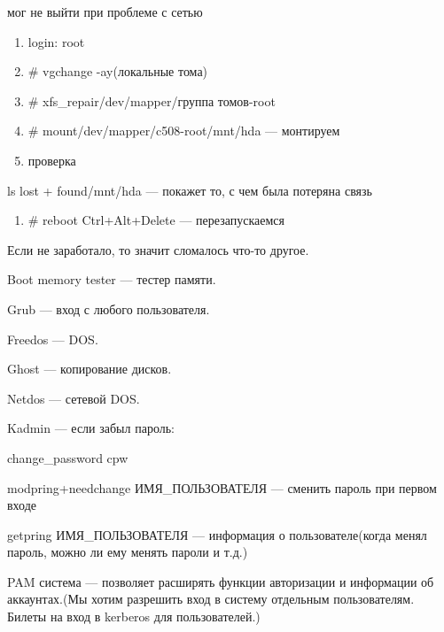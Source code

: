 мог не выйти при проблеме с сетью
\begin{enumerate}
	\item \par 
	login: root 
	
	\item \par 
	\# vgchange -ay(локальные тома)
	\item \par 
	\# xfs\_repair/dev/mapper/группа томов-root
	\item \par 
	\# mount/dev/mapper/c508-root/mnt/hda — монтируем
	\item \par 
	проверка 
	
\end{enumerate}
\par 
ls lost + found/mnt/hda — покажет то, с чем была
потеряна связь
\begin{enumerate}
	\item \par 
	\# reboot Ctrl+Alt+Delete — перезапускаемся
\end{enumerate}
\par 
Если не заработало, то значит сломалось
что-то другое.
\par 


\par 
Boot memory tester — тестер памяти.
\par 
Grub — вход с любого пользователя.
\par 
Freedos — DOS.
\par 
Ghost — копирование дисков.
\par 
Netdos — сетевой DOS.
\par 


\par 
Kadmin — если забыл пароль:
\par 
change\_password cpw
\par 
modpring+needchange ИМЯ\_ПОЛЬЗОВАТЕЛЯ — сменить
пароль при первом входе
\par 
getpring ИМЯ\_ПОЛЬЗОВАТЕЛЯ — информация о
пользователе(когда менял пароль, можно
ли ему менять пароли и т.д.)
\par 
PAM система — позволяет расширять функции
авторизации и информации об аккаунтах.(Мы
хотим разрешить вход в систему отдельным
пользователям. Билеты на вход в kerberos
для пользователей.)
\par 


